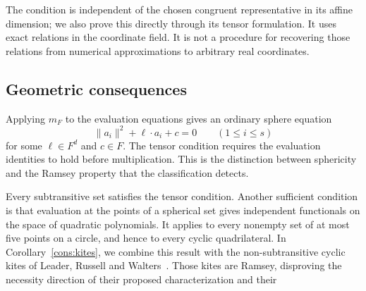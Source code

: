 The condition is independent of the chosen congruent representative
in its affine dimension; we also prove this directly through its tensor
formulation. It uses exact relations in the coordinate field. It is
not a procedure for recovering those relations from numerical
approximations to arbitrary real coordinates.

\subsection{Geometric consequences}

Applying $m_F$ to the evaluation equations gives an ordinary sphere
equation
\[
 \|a_i\|^2+\ell\cdot a_i+c=0\qquad(1\le i\le s)
\]
for some $\ell\in F^d$ and $c\in F$. The tensor condition requires the
evaluation identities to hold before multiplication. This is the
distinction between sphericity and the Ramsey property that the
classification detects.

Every subtransitive set satisfies the tensor condition. Another
sufficient condition is that evaluation at the points of a spherical
set gives independent functionals on the space of quadratic
polynomials. It applies to every nonempty set of at most five points
on a circle, and hence to every cyclic quadrilateral. In
Corollary~\ref{cons:kites}, we combine this result with the
non-subtransitive cyclic kites of Leader, Russell and
Walters~\cite[Corollary~2]{lrw-kites}. Those kites are Ramsey, disproving
the necessity direction of their proposed characterization and their
